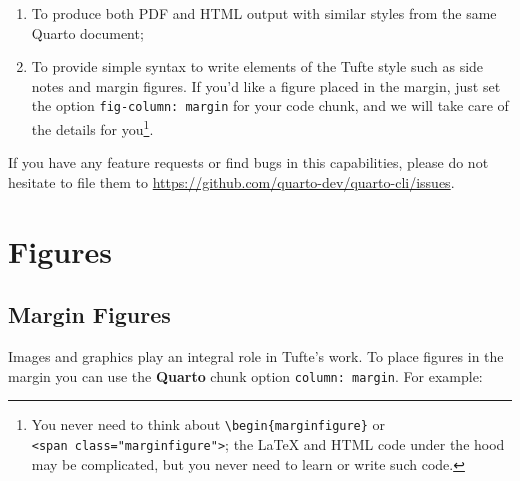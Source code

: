 \documentclass[
  letterpaper,
  DIV=11,
  numbers=noendperiod,
  oneside]{scrartcl}
\newenvironment{Shaded}{\begin{snugshade}}{\end{snugshade}}
\newcommand{\AttributeTok}[1]{\textcolor[rgb]{0.40,0.45,0.13}{#1}}
\newcommand{\FunctionTok}[1]{\textcolor[rgb]{0.28,0.35,0.67}{#1}}
\newcommand{\NormalTok}[1]{\textcolor[rgb]{0.00,0.23,0.31}{#1}}
\newcommand{\OtherTok}[1]{\textcolor[rgb]{0.00,0.23,0.31}{#1}}
\newcommand{\SpecialCharTok}[1]{\textcolor[rgb]{0.37,0.37,0.37}{#1}}
\newcommand{\StringTok}[1]{\textcolor[rgb]{0.13,0.47,0.30}{#1}}
\providecommand{\tightlist}{%
  \setlength{\itemsep}{0pt}\setlength{\parskip}{0pt}}\usepackage{longtable,booktabs,array}
\begin{document}
\begin{enumerate}
\def\labelenumi{\arabic{enumi}.}
\tightlist
\item
  To produce both PDF and HTML output with similar styles from the same
  Quarto document;
\item
  To provide simple syntax to write elements of the Tufte style such as
  side notes and margin figures. If you'd like a figure placed in the
  margin, just set the option \texttt{fig-column:\ margin} for your code
  chunk, and we will take care of the details for you\footnote{You never
    need to think about \texttt{\textbackslash{}begin\{marginfigure\}}
    or \texttt{\textless{}span\ class="marginfigure"\textgreater{}}; the
    LaTeX and HTML code under the hood may be complicated, but you never
    need to learn or write such code.}.
\end{enumerate}

If you have any feature requests or find bugs in this capabilities,
please do not hesitate to file them to
\href{https://github.com/rstudio/tufte/issues}{https://github.com/quarto-dev/quarto-cli/issues}.

\hypertarget{figures}{%
\section{Figures}\label{figures}}

\hypertarget{margin-figures}{%
\subsection{Margin Figures}\label{margin-figures}}

Images and graphics play an integral role in Tufte's work. To place
figures in the margin you can use the \textbf{Quarto} chunk option
\texttt{column:\ margin}. For example:

\begin{Shaded}
\end{Shaded}
\end{document}
